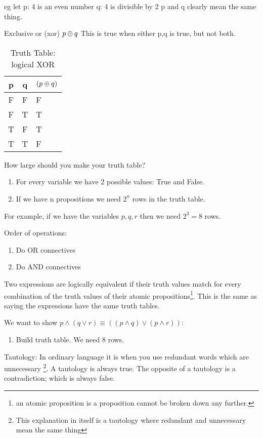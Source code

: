 eg let p: 4 is an even number
       q: 4 is divisible by 2
       p and q clearly mean the same thing.
       
Exclusive or (xor) $p \oplus q$
This is true when either p,q is true, but not both.

\begin{table}[!htb]
\label{tab:TruthTableXOR}
\begin{tabularx}{\linewidth}{| c | c | X |} \hline
  p & q & $( p \oplus q )$ \\ \hline \hline
  F & F & F \\ \hline
  F & T & T \\ \hline
  T & F & T \\ \hline
  T & T & F \\ \hline
\end{tabularx}
\caption{Truth Table: logical XOR}
\end{table}

How large should you make your truth table?
\begin{enumerate}
  \item For every variable we have 2 possible values: True and False.
  \item If we have n propositions we need ${2}^{n}$ rows in the truth table.
\end{enumerate}
For example, if we have the variables $p,q,r$ then we need ${2}^{3} = 8$ rows.


Order of operations:

\begin{enumerate}
  \item Do OR connectives
  \item Do AND connectives
\end{enumerate}


Two expressions are logically equivalent if their truth values match for every
combination of the truth values of their atomic propositions\footnote{an atomic
proposition is a proposition cannot be broken down any further.}. This is the
same as saying the expressions have the same truth tables.

We want to show $p \land (q \lor r) \equiv ( (p \land q) \lor (p \land r) )$:
\begin{enumerate}
  \item Build truth table. We need 8 rows.
\end{enumerate}

Tautology: In ordinary language it is when you use redundant words which are
unnecessary \footnote{This explanation in itself is a tautology where redundant
and unnecessary mean the same thing}. A tautology is always true. The opposite
of a tautology is a contradiction; which is always false.


